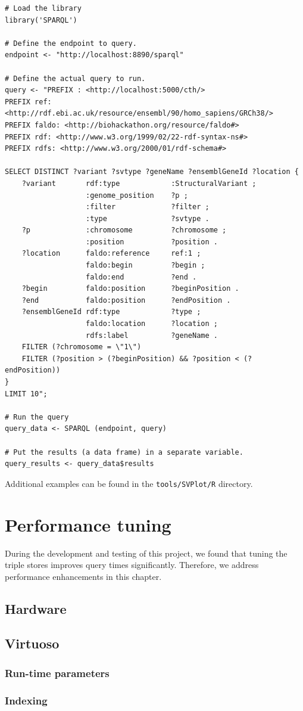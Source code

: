 \documentclass[11pt,a4paper,oneside]{book}
\begin{document}
\begin{siderules}
\begin{verbatim}
# Load the library
library('SPARQL')

# Define the endpoint to query.
endpoint <- "http://localhost:8890/sparql"

# Define the actual query to run.
query <- "PREFIX : <http://localhost:5000/cth/>
PREFIX ref: <http://rdf.ebi.ac.uk/resource/ensembl/90/homo_sapiens/GRCh38/>
PREFIX faldo: <http://biohackathon.org/resource/faldo#>
PREFIX rdf: <http://www.w3.org/1999/02/22-rdf-syntax-ns#>
PREFIX rdfs: <http://www.w3.org/2000/01/rdf-schema#>

SELECT DISTINCT ?variant ?svtype ?geneName ?ensemblGeneId ?location {
    ?variant       rdf:type            :StructuralVariant ;
                   :genome_position    ?p ;
                   :filter             ?filter ;
                   :type               ?svtype .
    ?p             :chromosome         ?chromosome ;
                   :position           ?position .
    ?location      faldo:reference     ref:1 ;
                   faldo:begin         ?begin ;
                   faldo:end           ?end .
    ?begin         faldo:position      ?beginPosition .
    ?end           faldo:position      ?endPosition .
    ?ensemblGeneId rdf:type            ?type ;
                   faldo:location      ?location ;
                   rdfs:label          ?geneName .
    FILTER (?chromosome = \"1\")
    FILTER (?position > (?beginPosition) && ?position < (?endPosition))
}
LIMIT 10";

# Run the query
query_data <- SPARQL (endpoint, query)

# Put the results (a data frame) in a separate variable.
query_results <- query_data$results
\end{verbatim}
\end{siderules}

Additional examples can be found in the \texttt{tools/SVPlot/R} directory.

\chapter{Performance tuning}

  During the development and testing of this project, we found that tuning the
  triple stores improves query times significantly.  Therefore, we address
  performance enhancements in this chapter.

\section{Hardware}


\section{Virtuoso}

\subsection{Run-time parameters}
\subsection{Indexing}
\end{document}
